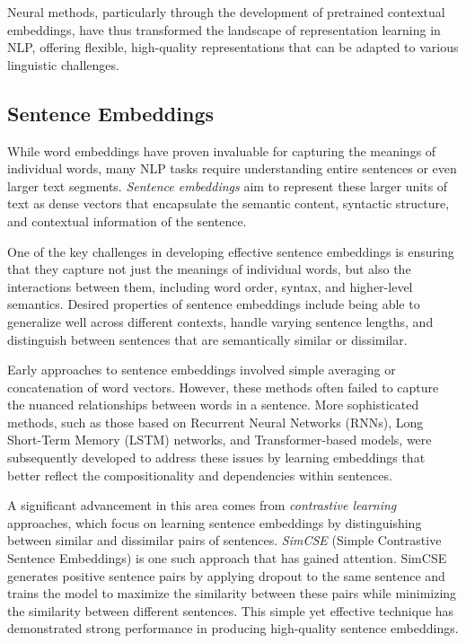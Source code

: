Neural methods, particularly through the development of pretrained contextual embeddings, have thus transformed the landscape of representation learning in NLP, offering flexible, high-quality representations that can be adapted to various linguistic challenges.


\subsection{Sentence Embeddings}

While word embeddings have proven invaluable for capturing the meanings of individual words, many NLP tasks require understanding entire sentences or even larger text segments. \textit{Sentence embeddings} aim to represent these larger units of text as dense vectors that encapsulate the semantic content, syntactic structure, and contextual information of the sentence.

One of the key challenges in developing effective sentence embeddings is ensuring that they capture not just the meanings of individual words, but also the interactions between them, including word order, syntax, and higher-level semantics. Desired properties of sentence embeddings include being able to generalize well across different contexts, handle varying sentence lengths, and distinguish between sentences that are semantically similar or dissimilar.

Early approaches to sentence embeddings involved simple averaging or concatenation of word vectors. However, these methods often failed to capture the nuanced relationships between words in a sentence. More sophisticated methods, such as those based on Recurrent Neural Networks (RNNs), Long Short-Term Memory (LSTM) networks, and Transformer-based models, were subsequently developed to address these issues by learning embeddings that better reflect the compositionality and dependencies within sentences.

A significant advancement in this area comes from \textit{contrastive learning} approaches, which focus on learning sentence embeddings by distinguishing between similar and dissimilar pairs of sentences. \textit{SimCSE} (Simple Contrastive Sentence Embeddings) is one such approach that has gained attention. SimCSE generates positive sentence pairs by applying dropout to the same sentence and trains the model to maximize the similarity between these pairs while minimizing the similarity between different sentences. This simple yet effective technique has demonstrated strong performance in producing high-quality sentence embeddings.

